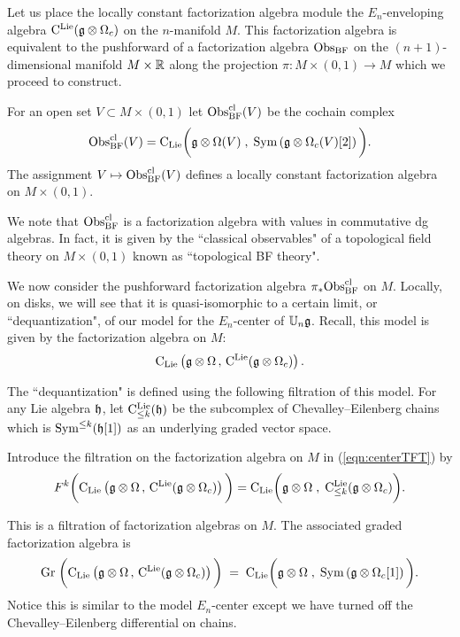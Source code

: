 \documentclass[11pt]{amsart}
\numberwithin{equation}{section}
\begin{document}
Let us place the locally constant factorization algebra module the $E_n$-enveloping algebra ${\rm C}^{\rm Lie}(\mathfrak g \otimes \Omega_c)$ on the $n$-manifold $M$.
This factorization algebra is equivalent to the pushforward of a factorization algebra ${\rm Obs}_{\rm BF}$ on the $(n+1)$-dimensional manifold $M \times \mathbb R$ along the projection $\pi : M \times (0,1) \to M$ which we proceed to construct. 

\begin{dfn}
For an open set $V \subset M \times (0,1)$ let ${\rm Obs}^{\rm cl}_{\rm BF} (V)$ be the cochain complex 
\[
{\rm Obs}^{\rm cl}_{\rm BF} (V) = {\rm C}_{{\rm Lie}} \bigg(\mathfrak g \otimes \Omega (V) \; , \; {\rm Sym} \left(\mathfrak g \otimes \Omega_c(V) [2] \right) \bigg) .
\]
The assignment $V \mapsto {\rm Obs}^{\rm cl}_{\rm BF}(V)$ defines a locally constant factorization algebra on $M \times (0,1)$. 
\end{dfn}

We note that ${\rm Obs}_{\rm BF}^{\rm cl}$ is a factorization algebra with values in commutative dg algebras. 
In fact, it is given by the ``classical observables" of a topological field theory on $M \times (0,1)$ known as ``topological BF theory". 

We now consider the pushforward factorization algebra $\pi_* {\rm Obs}^{\rm cl}_{\rm BF}$ on $M$.
Locally, on disks, we will see that it is quasi-isomorphic to a certain limit, or ``dequantization", of our model for the $E_n$-center of $\mathbb U_n \mathfrak g$.
Recall, this model is given by the factorization algebra on $M$:
\begin{equation}\label{eqn:centerTFT}
{\rm C}_{{\rm Lie}}\left(\mathfrak g \otimes \Omega \, , \, {\rm C}^{\rm Lie} (\mathfrak g \otimes \Omega_c) \right) .
\end{equation}

The ``dequantization" is defined using the following filtration of this model.
For any Lie algebra $\mathfrak h$, let ${\rm C}^{\rm Lie}_{\leq k} (\mathfrak h)$ be the subcomplex of Chevalley--Eilenberg chains which is ${\rm Sym}^{\leq k} (\mathfrak h[1])$ as an underlying graded vector space. 

\begin{dfn}
Introduce the filtration on the factorization algebra on $M$ in (\ref{eqn:centerTFT}) by 
\[
F^k \bigg({\rm C}_{{\rm Lie}}\left(\mathfrak g \otimes \Omega \, , \, {\rm C}^{\rm Lie} (\mathfrak g \otimes \Omega_c) \right) \bigg) = {\rm C}_{{\rm Lie}} \bigg(\mathfrak g \otimes \Omega \; , \; {\rm C}^{\rm Lie}_{\leq k} (\mathfrak g \otimes \Omega_c) \bigg) .
\]
\end{dfn}

This is a filtration of factorization algebras on $M$. 
The associated graded factorization algebra is
\[
{\rm Gr} \; \bigg({\rm C}_{{\rm Lie}}\left(\mathfrak g \otimes \Omega \, , \, {\rm C}^{\rm Lie} (\mathfrak g \otimes \Omega_c) \right) \bigg) \; = \; {\rm C}_{{\rm Lie}} \bigg(\mathfrak g \otimes \Omega \; , \; {\rm Sym} \left(\mathfrak g \otimes \Omega_c [1] \right) \bigg) .
\]
Notice this is similar to the model $E_n$-center except we have turned off the Chevalley--Eilenberg differential on chains. 
\end{document}
